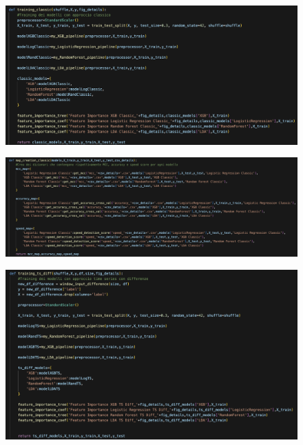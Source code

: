 \begin{appendices}
\begin{figure}[H]
    \centering
    \includegraphics[width=1\linewidth]{15.png}
    \label{fig:enter-label}
\end{figure}

\begin{figure}[H]
    \centering
    \includegraphics[width=1\linewidth]{16.png}
    \label{fig:enter-label}
\end{figure}

\begin{figure}[H]
    \centering
    \includegraphics[width=1\linewidth]{17.png}
    \label{fig:enter-label}
\end{figure}


\end{appendices}
